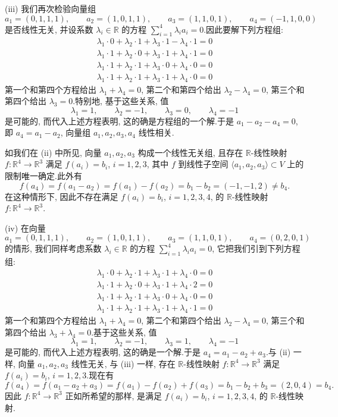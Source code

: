 (iii) 我们再次检验向量组
\[
a_1 = (0, 1, 1, 1), \qquad a_2 = (1, 0, 1, 1), \qquad a_3 = (1, 1, 0, 1), \qquad a_4 = (-1, 1, 0, 0)
\]
是否线性无关, 并设系数 $\lambda_i \in \mathbb{R}$ 的方程 $\sum_{i = 1}^{4} \lambda_i a_i = 0$.因此要解下列方程组:
\[
\begin{array}{l}
\lambda_1 \cdot 0 + \lambda_2 \cdot 1 + \lambda_3 \cdot 1 - \lambda_4 \cdot 1 = 0\\
\lambda_1 \cdot 1 + \lambda_2 \cdot 0 + \lambda_3 \cdot 1 + \lambda_4 \cdot 1 = 0\\
\lambda_1 \cdot 1 + \lambda_2 \cdot 1 + \lambda_3 \cdot 0 + \lambda_4 \cdot 0 = 0\\
\lambda_1 \cdot 1 + \lambda_2 \cdot 1 + \lambda_3 \cdot 1 + \lambda_4 \cdot 0 = 0
\end{array}
\]
第一个和第四个方程给出 $\lambda_1 + \lambda_4 = 0$, 第二个和第四个给出 $\lambda_2 - \lambda_4 = 0$, 第三个和第四个给出 $\lambda_3 = 0$.特别地, 基于这些关系, 值
\[
\lambda_1 = 1, \qquad \lambda_2 = -1, \qquad \lambda_3 = 0, \qquad \lambda_4 = -1
\]
是可能的, 而代入上述方程表明, 这的确是方程组的一个解.于是 $a_1 - a_2 - a_4 = 0$, 即 $a_4 = a_1 - a_2$, 向量组 $a_1, a_2, a_3, a_4$ 线性相关.

如我们在 (ii) 中所见, 向量 $a_1, a_2, a_3$ 构成一个线性无关组, 且存在 $\mathbb{R}$-线性映射 $f \colon \mathbb{R}^4 \longrightarrow \mathbb{R}^3$ 满足 $f(a_i) = b_i$, $i = 1, 2, 3$, 其中 $f$ 到线性子空间 $\langle a_1, a_2, a_3 \rangle \subset V$ 上的限制唯一确定.此外有
\[
f(a_4) = f(a_1 - a_2) = f(a_1) - f(a_2) = b_1 - b_2 = (-1, -1, 2) \neq b_4\text{.}
\]
在这种情形下, 因此不存在满足 $f(a_i) = b_i$, $i = 1, 2, 3, 4$, 的 $\mathbb{R}$-线性映射 $f \colon \mathbb{R}^4 \longrightarrow \mathbb{R}^3$.

(iv) 在向量
\[
a_1 = (0, 1, 1, 1), \qquad a_2 = (1, 0, 1, 1), \qquad a_3 = (1, 1, 0, 1), \qquad a_4 = (0, 2, 0, 1)
\]
的情形, 我们同样考虑系数 $\lambda_i \in \mathbb{R}$ 的方程 $\sum_{i = 1}^{4} \lambda_i a_i = 0$, 它把我们引到下列方程组:
\[
\begin{array}{l}
\lambda_1 \cdot 0 + \lambda_2 \cdot 1 + \lambda_3 \cdot 1 + \lambda_4 \cdot 0 = 0\\
\lambda_1 \cdot 1 + \lambda_2 \cdot 0 + \lambda_3 \cdot 1 + \lambda_4 \cdot 2 = 0\\
\lambda_1 \cdot 1 + \lambda_2 \cdot 1 + \lambda_3 \cdot 0 + \lambda_4 \cdot 0 = 0\\
\lambda_1 \cdot 1 + \lambda_2 \cdot 1 + \lambda_3 \cdot 1 + \lambda_4 \cdot 1 = 0
\end{array}
\]
第一个和第四个方程给出 $\lambda_1 + \lambda_4 = 0$, 第二个和第四个给出 $\lambda_2 - \lambda_4 = 0$, 第三个和第四个给出 $\lambda_3 + \lambda_4 = 0$.基于这些关系, 值
\[
\lambda_1 = 1, \qquad \lambda_2 = -1, \qquad \lambda_3 = 1, \qquad \lambda_4 = -1
\]
是可能的, 而代入上述方程表明, 这的确是一个解.于是 $a_4 = a_1 - a_2 + a_3$.与 (ii) 一样, 向量 $a_1, a_2, a_3$ 线性无关, 与 (iii) 一样, 存在 $\mathbb{R}$-线性映射 $f \colon \mathbb{R}^4 \longrightarrow \mathbb{R}^3$ 满足 $f(a_i) = b_i$, $i = 1, 2, 3$.现在有
\[
f(a_4) = f(a_1 - a_2 + a_3) = f(a_1) - f(a_2) + f(a_3) = b_1 - b_2 + b_3 = (2, 0, 4) = b_4\text{.}
\]
因此 $f \colon \mathbb{R}^4 \longrightarrow \mathbb{R}^3$ 正如所希望的那样, 是满足 $f(a_i) = b_i$, $i = 1, 2, 3, 4$, 的 $\mathbb{R}$-线性映射.

